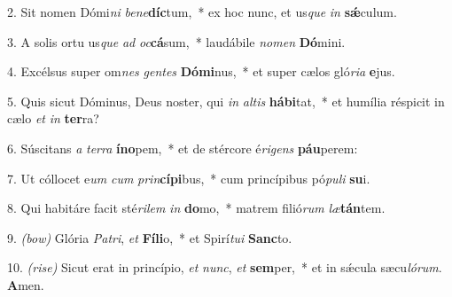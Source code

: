 2. Sit nomen Dómi\textit{ni} \textit{be}\textit{ne}\textbf{díc}tum,~* 
	ex hoc nunc, et us\textit{que} \textit{in} \textbf{s\'{\ae}}culum.

3. A solis ortu us\textit{que} \textit{ad} \textit{oc}\textbf{cá}sum,~* 
	laudábile \textit{no}\textit{men} \textbf{Dó}mini.

4. Excélsus super om\textit{nes} \textit{gen}\textit{tes} \textbf{Dó}\textbf{mi}nus,~* 
	et super cælos gló\textit{ri}\textit{a} \textbf{e}jus.

5. Quis sicut Dóminus, Deus noster, qui \textit{in} \textit{al}\textit{tis} \textbf{há}\textbf{bi}tat,~* 
	et humília réspicit in cælo \textit{et} \textit{in} \textbf{ter}ra?

6. Súscitans \textit{a} \textit{ter}\textit{ra} \textbf{ín}\textbf{o}pem,~* 
	et de stércore é\textit{ri}\textit{gens} \textbf{páu}perem:

7. Ut cóllocet e\textit{um} \textit{cum} \textit{prin}\textbf{cí}\textbf{pi}bus,~* 
	cum princípibus pó\textit{pu}\textit{li} \textbf{su}i.

8. Qui habitáre facit sté\textit{ri}\textit{lem} \textit{in} \textbf{do}mo,~* 
	matrem filió\textit{rum} \textit{læ}\textbf{tán}tem.

9. {\color{red}\textit{(bow)}} Glória \textit{Pa}\textit{tri}, \textit{et} \textbf{Fí}\textbf{li}o,~* 
	et Spirí\textit{tu}\textit{i} \textbf{Sanc}to.

10. {\color{red}\textit{(rise)}}  Sicut erat in princípio, \textit{et} \textit{nunc}, \textit{et} \textbf{sem}per,~* 
	et in s\'{\ae}cula sæcu\textit{ló}\textit{rum}. \textbf{A}men.